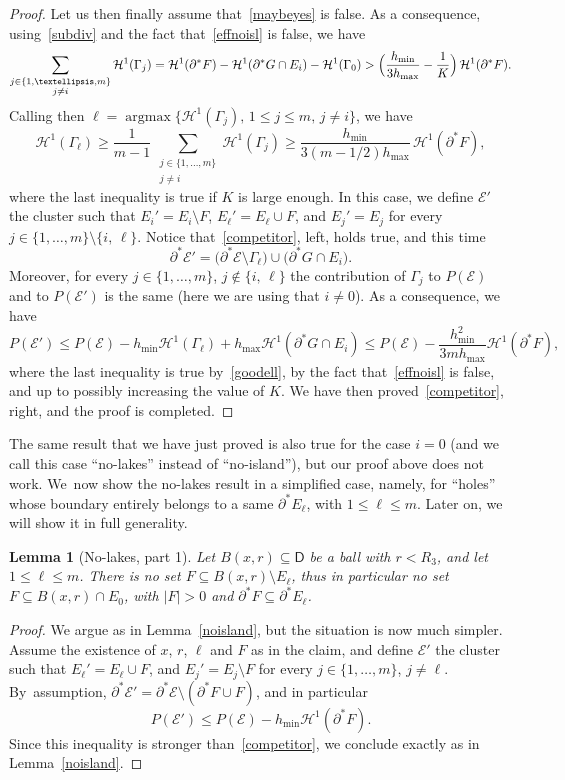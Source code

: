 \documentclass[11pt]{article}
\numberwithin{equation}{section}
\DeclareMathOperator{\argmax}{argmax}
\newcommand\doppio[2]{\substack{#1\\#2}}
\newcommand\E{\mathcal{E}}
\renewcommand\H{\mathcal{H}}
\theoremstyle{plain}
\newtheorem{lem}[thm]{Lemma}
\theoremstyle{definition}
\begin{document}
\begin{proof}
Let us then finally assume that~\eqref{maybeyes} is false. As a consequence, using~\eqref{subdiv} and the fact that~\eqref{effnoisl} is false, we have
\[
\sum_{{\doppio{j\in \{1,\dots,m\}}{j\neq i}}} \H^1(\Gamma_j) = \H^1(\partial^* F) - \H^1(\partial^* G\cap E_i) - \H^1(\Gamma_0)
> \Bigl(\frac{h_{\min}}{3h_{\max}}- \frac 1K\Bigr)\, \H^1(\partial^* F).
\]
Calling then $\ell=\argmax \big\{\H^1(\Gamma_j),\, 1\leq j\leq m,\, j\neq i\big\}$, we have
\begin{equation}\label{goodell}
\H^1(\Gamma_\ell)\geq \frac 1 {m-1}\, \sum_{{\doppio{j\in \{1,\dots,m\}}{j\neq i}}} \H^1(\Gamma_j)
\geq \frac{h_{\min}}{3(m-1/2)h_{\max}}\, \H^1(\partial^* F),
\end{equation}
where the last inequality is true if $K$ is large enough. In this case, we define $\E'$ the cluster such that $E_i'=E_i\setminus F$, $E_\ell'=E_\ell\cup F$, and $E_j'=E_j$ for every $j \in \{1,\dots, m\}\setminus \{i,\, \ell\}$. Notice that~\eqref{competitor}, left, holds true, and this time
\[
\partial^* \E' = \big(\partial^* \E \setminus \Gamma_\ell\big) \cup \big(\partial^* G\cap E_i\big).
\]
Moreover, for every $j\in\{1,\dots,m\}$, $j\notin \{i,\,\ell\}$ the contribution of $\Gamma_j$ to $P(\E)$ and to $P(\E')$ is the same (here we are using that $i\neq 0$). As a consequence, we have
\[
P(\E') \leq P(\E) - h_{\min} \H^1(\Gamma_\ell) + h_{\max} \H^1(\partial^* G\cap E_i) \leq P(\E) - \frac{h_{\min}^2}{3mh_{\max}}\H^1(\partial^* F),
\]
where the last inequality is true by~\eqref{goodell}, by the fact that~\eqref{effnoisl} is false, and up to possibly increasing the value of $K$. We have then proved~\eqref{competitor}, right, and the proof is completed.
\end{proof}

The same result that we have just proved is also true for the case $i=0$ (and we call this case ``no-lakes'' instead of ``no-island''), but our proof above does not work. We~now show the no-lakes result in a simplified case, namely, for ``holes'' whose boundary entirely belongs to a same $\partial^* E_\ell$, with $1\leq \ell\leq m$. Later on, we will show it in full generality.

\begin{lem}[No-lakes, part 1]\label{nolakes}
Let $B(x,r)\subseteq \mathsf{D}$ be a ball with $r< R_3$, and let $1\leq \ell\leq m$. There is no set $F\subseteq B(x,r)\setminus E_\ell$, thus in particular no set $F\subseteq B(x,r)\cap E_0$, with $|F|>0$ and $\partial^* F \subseteq \partial^* E_\ell$.
\end{lem}
\begin{proof}
We argue as in Lemma~\ref{noisland}, but the situation is now much simpler. Assume the existence of $x$, $r$, $\ell$ and $F$ as in the claim, and define $\E'$ the cluster such that $E_\ell'=E_\ell\cup F$, and $E_j'=E_j\setminus F$ for every $j\in\{1,\dots,m\}$, $j\neq \ell$. By~as\-sump\-tion, $\partial^*\E'=\partial^*\E\setminus (\partial^*F\cup F)$, and in particular
\[
P(\E')\leq P(\E) - h_{\min} \H^1(\partial^* F).
\]
Since this inequality is stronger than~\eqref{competitor}, we conclude exactly as in Lemma~\ref{noisland}.
\end{proof}
\end{document}
